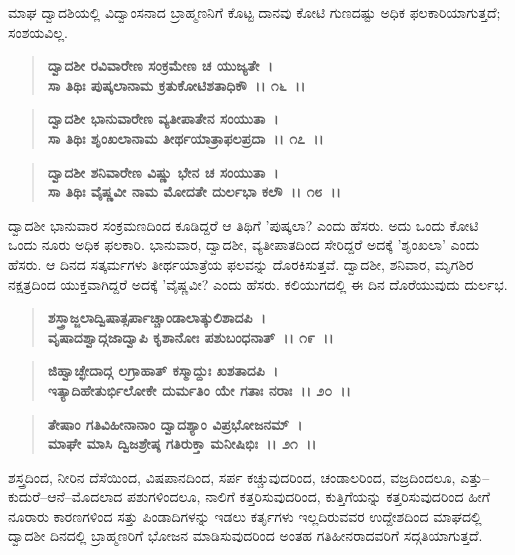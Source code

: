 ಮಾಘ ದ್ವಾದಶಿಯಲ್ಲಿ ವಿದ್ವಾಂಸನಾದ ಬ್ರಾಹ್ಮಣನಿಗೆ ಕೊಟ್ಟ ದಾನವು ಕೋಟಿ ಗುಣದಷ್ಟು ಅಧಿಕ ಫಲಕಾರಿಯಾಗುತ್ತದೆ; ಸಂಶಯವಿಲ್ಲ.

\begin{verse}
\textbf{ದ್ವಾದಶೀ ರವಿವಾರೇಣ ಸಂಕ್ರಮೇಣ ಚ ಯುಜ್ಯತೇ~।}\\\textbf{ಸಾ ತಿಥಿಃ ಪುಷ್ಕಲಾನಾಮ ಕ್ರತುಕೋಟಿಶತಾಧಿಕೌ~।। ೧೬~।।} 
\end{verse}

\begin{verse}
\textbf{ದ್ವಾದಶೀ ಭಾನುವಾರೇಣ ವ್ಯತೀಪಾತೇನ ಸಂಯುತಾ~।}\\\textbf{ಸಾ ತಿಥಿಃ ಶೃಂಖಲಾನಾಮ ತೀರ್ಥಯಾತ್ರಾಫಲಪ್ರದಾ~।। ೧೭~।। }
\end{verse}

\begin{verse}
\textbf{ದ್ವಾದಶೀ ಶನಿವಾರೇಣ ವಿಷ್ಣು ಭೇನ ಚ ಸಂಯುತಾ~।}\\\textbf{ಸಾ ತಿಥಿಃ ವೈಷ್ಣವೀ ನಾಮ ಮೋದತೇ ದುರ್ಲಭಾ ಕಲೌ~।। ೧೮~।।}
\end{verse}

ದ್ವಾದಶೀ ಭಾನುವಾರ ಸಂಕ್ರಮಣದಿಂದ ಕೂಡಿದ್ದರೆ ಆ ತಿಥಿಗೆ 'ಪುಷ್ಕಲಾ? ಎಂದು ಹೆಸರು. ಅದು ಒಂದು ಕೋಟಿ ಒಂದು ನೂರು ಅಧಿಕ ಫಲಕಾರಿ. ಭಾನುವಾರ, ದ್ವಾದಶೀ, ವ್ಯತೀಪಾತದಿಂದ ಸೇರಿದ್ದರೆ ಅದಕ್ಕೆ 'ಶೃಂಖಲಾ' ಎಂದು ಹೆಸರು. ಆ ದಿನದ ಸತ್ಕರ್ಮಗಳು ತೀರ್ಥಯಾತ್ರೆಯ ಫಲವನ್ನು ದೊರಕಿಸುತ್ತವೆ. ದ್ವಾದಶೀ, ಶನಿವಾರ, ಮೃಗಶಿರ ನಕ್ಷತ್ರದಿಂದ ಯುಕ್ತವಾಗಿದ್ದರೆ ಅದಕ್ಕೆ 'ವೈಷ್ಣವೀ? ಎಂದು ಹೆಸರು. ಕಲಿಯುಗದಲ್ಲಿ ಈ ದಿನ ದೊರೆಯುವುದು ದುರ್ಲಭ.

\begin{verse}
\textbf{ಶಸ್ತ್ರಾಜ್ಜಲಾದ್ವಿಷಾತ್ಸರ್ಪಾಚ್ಚಾಂಡಾಲಾತ್ಕುಲಿಶಾದಪಿ~।}\\\textbf{ವೃಷಾದಶ್ವಾದ್ಗಜಾದ್ವಾಪಿ ಕೃಶಾನೋಃ ಪಶುಬಂಧನಾತ್~।। ೧೯~।। }
\end{verse}

\begin{verse}
\textbf{ಜಿಹ್ವಾಚ್ಛೇದಾದ್ಗ ಲಗ್ರಾಹಾತ್ ಕಸ್ಮಾದ್ದುಃ ಖಶತಾದಪಿ~।}\\\textbf{ಇತ್ಯಾದಿಹೇತುರ್ಭಿಲೋಕೇ ದುರ್ಮತಿಂ ಯೇ ಗತಾಃ ನರಾಃ~।। ೨೦~।। }
\end{verse}

\begin{verse}
\textbf{ತೇಷಾಂ ಗತಿವಿಹೀನಾನಾಂ ದ್ವಾದಶ್ಯಾಂ ವಿಪ್ರಭೋಜನಮ್~।}\\\textbf{ಮಾಘೇ ಮಾಸಿ ದ್ವಿಜಶ್ರೇಷ್ಠ ಗತಿರುಕ್ತಾ ಮನೀಷಿಭಿಃ~।। ೨೧~।।}
\end{verse}

ಶಸ್ತ್ರದಿಂದ, ನೀರಿನ ದೆಸೆಯಿಂದ, ವಿಷಪಾನದಿಂದ, ಸರ್ಪ ಕಚ್ಚುವುದರಿಂದ, ಚಂಡಾಲರಿಂದ, ವಜ್ರದಿಂದಲೂ, ಎತ್ತು–ಕುದುರೆ–ಆನೆ–ಮೊದಲಾದ ಪಶುಗಳಿಂದಲೂ, ನಾಲಿಗೆ ಕತ್ತರಿಸುವುದರಿಂದ, ಕುತ್ತಿಗೆಯನ್ನು ಕತ್ತರಿಸುವುದರಿಂದ ಹೀಗೆ ನೂರಾರು ಕಾರಣಗಳಿಂದ ಸತ್ತು ಪಿಂಡಾದಿಗಳನ್ನು ಇಡಲು ಕರ್ತೃಗಳು ಇಲ್ಲದಿರುವವರ ಉದ್ದೇಶದಿಂದ ಮಾಘದಲ್ಲಿ ದ್ವಾದಶೀ ದಿನದಲ್ಲಿ ಬ್ರಾಹ್ಮಣರಿಗೆ ಭೋಜನ ಮಾಡಿಸುವುದರಿಂದ ಅಂತಹ ಗತಿಹೀನರಾದವರಿಗೆ ಸದ್ಗತಿಯಾಗುತ್ತದೆ.

